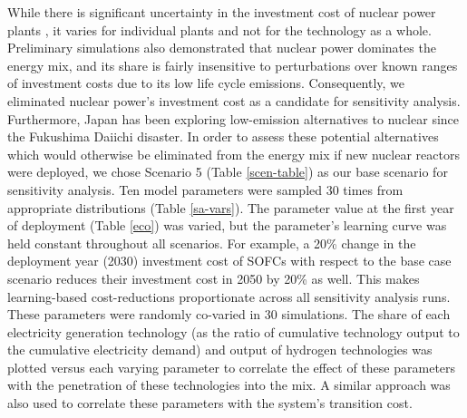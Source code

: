 While there is significant uncertainty in the investment cost of nuclear power plants \cite{lovering_historical_2016}, it varies for individual plants and not for the technology as a whole. Preliminary simulations also demonstrated that nuclear power dominates the energy mix, and its share is fairly insensitive to perturbations over known ranges of investment costs \cite{lovering_historical_2016} due to its low life cycle emissions. Consequently, we eliminated nuclear power's investment cost as a candidate for sensitivity analysis. Furthermore, Japan has been exploring low-emission alternatives to nuclear since the Fukushima Daiichi disaster. In order to assess these potential alternatives which would otherwise be eliminated from the energy mix if new nuclear reactors were deployed, we chose Scenario 5 (Table \ref{scen-table}) as our base scenario for sensitivity analysis. Ten model parameters were sampled 30 times from appropriate distributions (Table \ref{sa-vars}). The parameter value at the first year of deployment (Table \ref{eco}) was varied, but the parameter's learning curve was held constant throughout all scenarios. For example, a 20\% change in the deployment year (2030) investment cost of \gls{SOFC}s with respect to the base case scenario reduces their investment cost in 2050 by 20\% as well. This makes learning-based cost-reductions proportionate across all sensitivity analysis runs. These parameters were randomly co-varied in 30 simulations. The share of each electricity generation technology (as the ratio of cumulative technology output to the cumulative electricity demand) and output of hydrogen technologies was plotted versus each varying parameter to correlate the effect of these parameters with the penetration of these technologies into the mix. A similar approach was also used to correlate these parameters with the system's transition cost.